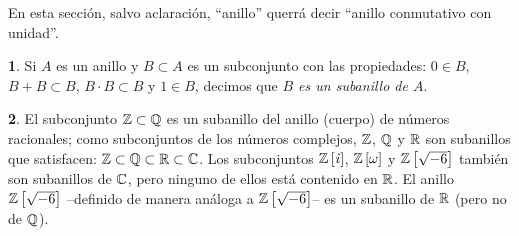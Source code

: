 \theoremstyle{plain}
\newtheorem{teoPolinomios}{\teoname}[section]
\newtheorem{coroPolinomios}[teoPolinomios]{\coroname}

\theoremstyle{definition}
\newtheorem{defPolinomios}[teoPolinomios]{}
\newtheorem{obsPolinomios}[teoPolinomios]{\obsname}
\newtheorem{ejemPolinomios}[teoPolinomios]{\ejemname}


En esta secci\'on, salvo aclaraci\'on, ``anillo'' querr\'a decir
``anillo conmutativo con unidad''.

\begin{defPolinomios}\label{def:polinomios:subanillo}
	Si $A$ es un anillo y $B\subset A$ es un subconjunto con las
	propiedades:
	$0\in B$, $B+B\subset B$, $B\cdot B\subset B$ y $1\in B$, decimos que
	\emph{$B$ es un subanillo de $A$}.
\end{defPolinomios}

\begin{ejemPolinomios}\label{ejem:polinomios:subanillo}
	El subconjunto $\mathbb{Z}\subset\mathbb{Q}$ es un subanillo del
	anillo (cuerpo) de n\'umeros racionales; como subconjuntos de los
	n\'umeros complejos, $\mathbb{Z}$, $\mathbb{Q}$ y $\mathbb{R}$ son
	subanillos que satisfacen:
	$\mathbb{Z}\subset\mathbb{Q}\subset\mathbb{R}\subset\mathbb{C}$.
	Los subconjuntos ${\mathbb{Z}}\left[\mathit i\right]$, ${\mathbb{Z}}\left[\omega\right]$ y
	${\mathbb{Z}}\left[\sqrt{-6}\right]$ tambi\'en son subanillos de
	$\mathbb{C}$, pero ninguno de ellos est\'a contenido en $\mathbb{R}$.
	El anillo ${\mathbb{Z}}\left[\sqrt{-6}\right]$ --definido de manera
	an\'aloga a ${\mathbb{Z}}\left[\sqrt{-6}\right]$-- es un subanillo de
	$\mathbb{R}$ (pero no de $\mathbb{Q}$).
\end{ejemPolinomios}

